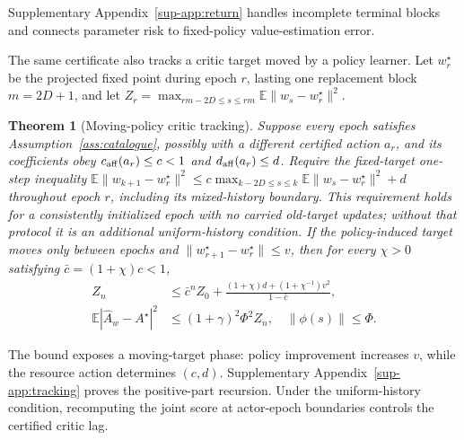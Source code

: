 \documentclass[journal]{IEEEtran}
\newtheorem{theorem}{Theorem}
\newcommand{\E}{\mathbb{E}}
\begin{document}
Supplementary Appendix~\ref{sup-app:return} handles incomplete terminal blocks and connects parameter risk to fixed-policy value-estimation error.

The same certificate also tracks a critic target moved by a policy learner.
Let $w_r^\star$ be the projected fixed point during epoch $r$, lasting one replacement block $m=2D+1$, and let $Z_r=\max_{rm-2D\le s\le rm}\E\|w_s-w_r^\star\|^2$.

\begin{theorem}[Moving-policy critic tracking]
Suppose every epoch satisfies Assumption~\ref{ass:catalogue}, possibly with a different certified action $a_r$, and its coefficients obey $c_{\rm aff}(a_r)\le c<1$ and $d_{\rm aff}(a_r)\le d$.
Require the fixed-target one-step inequality $\E\|w_{k+1}-w_r^\star\|^2\le c\max_{k-2D\le s\le k}\E\|w_s-w_r^\star\|^2+d$ throughout epoch $r$, including its mixed-history boundary.
This requirement holds for a consistently initialized epoch with no carried old-target updates; without that protocol it is an additional uniform-history condition.
If the policy-induced target moves only between epochs and
$\|w_{r+1}^\star-w_r^\star\|\le v$, then for every $\chi>0$ satisfying $\bar c=(1+\chi)c<1$,
\begin{align}
Z_n&\le \bar c^n Z_0+
\frac{(1+\chi)d+(1+\chi^{-1})v^2}{1-\bar c},\label{eq:tracking-bound}\\
\E|\widehat A_w-A^\star|^2
&\le (1+\gamma)^2\Phi^2 Z_n,\quad \|\phi(s)\|\le\Phi.
\label{eq:advantage-transfer}
\end{align}
\label{thm:tracking}
\end{theorem}

The bound exposes a moving-target phase: policy improvement increases $v$, while the resource action determines $(c,d)$.
Supplementary Appendix~\ref{sup-app:tracking} proves the positive-part recursion.
Under the uniform-history condition, recomputing the joint score at actor-epoch boundaries controls the certified critic lag.
\end{document}

